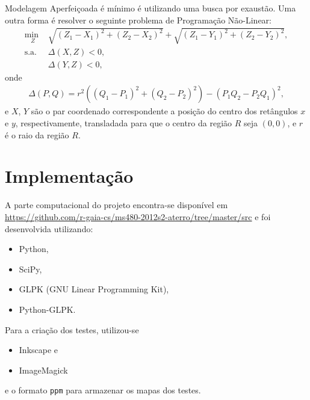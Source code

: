 \documentclass[11pt]{beamer}
\begin{document}
\begin{frame}{Modelagem Aperfeiçoada}
{é mínimo é utilizando uma busca por exaustão. Uma outra forma é resolver o
seguinte problema de Programação Não-Linear:
\begin{align*}
    \underset{Z}{\text{min }} & \sqrt{(Z_1 - X_1)^2 + (Z_2 - X_2)^2} +
    \sqrt{(Z_1 - Y_1)^2 + (Z_2 - Y_2)^2}, \\
    \text{s.a. } & \Delta(X, Z) < 0, \\
    & \Delta(Y, Z) < 0,
\end{align*}
onde
\begin{align*}
    \Delta(P, Q) = r^2 \left( (Q_1 - P_1)^2 + (Q_2 - P_2)^2 \right) - \left(
    P_1 Q_2 - P_2 Q_1 \right)^2,
\end{align*}
e $X$, $Y$ são o par coordenado correspondente a posição do centro dos
retângulos $x$ e $y$, respectivamente, transladada para que o centro da região
$R$ seja $(0, 0)$, e $r$ é o raio da região $R$.
}
\only<4>{
\begin{block}{}
A motivação para as duas restrições do programa de Programação Não-Linear
descrito acima decorre da condição para que uma reta que passe pelos pontos $P$
e $Q$ não possua pontos em comum com um círculo centrado no ponto $(0, 0)$ e
raio $r$. \footnote{Maiores detalhes são encontrados no Apêndice do relatório.}%
\end{block}
}
\end{frame}


\section{Implementação}

\begin{frame}
A parte computacional do projeto encontra-se disponível em
\url{https://github.com/r-gaia-cs/ms480-2012s2-aterro/tree/master/src} e foi
desenvolvida utilizando:
\begin{itemize}
    \item Python\nocite{Python},
    \item SciPy\nocite{SciPy},
    \item GLPK (GNU Linear Programming Kit)\nocite{GLPK},
    \item Python-GLPK.
\end{itemize}
Para a criação dos testes, utilizou-se
\begin{itemize}
    \item Inkscape e
    \item ImageMagick
\end{itemize}
e o formato \texttt{ppm} para armazenar os mapas dos testes.
\end{frame}
\end{document}
